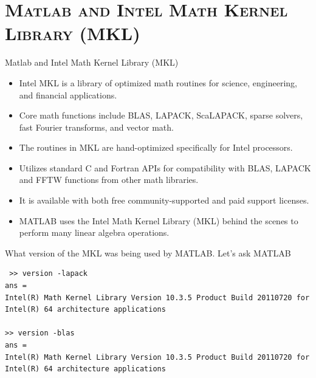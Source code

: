 \documentclass[xcolor=x11names,compress]{beamer}
\renewcommand{\(}{\begin{columns}}
\renewcommand{\)}{\end{columns}}
\newcommand{\<}[1]{\begin{column}{#1}}
\renewcommand{\>}{\end{column}}
\begin{document}
\section{\scshape Matlab and Intel Math Kernel Library (MKL)}
\begin{frame}[fragile]{Matlab and Intel Math Kernel Library (MKL)}
\begin{scriptsize}
\begin{itemize}
\item Intel MKL is a library of optimized math routines for science, engineering, and financial applications.
\item Core math functions include BLAS, LAPACK, ScaLAPACK, sparse solvers, fast Fourier transforms, and vector math. 
\item The routines in MKL are hand-optimized specifically for Intel processors.
\item Utilizes standard C and Fortran APIs for compatibility with BLAS, LAPACK and FFTW functions from other math libraries.
\item It is available with both free community-supported and paid support licenses.
\item MATLAB uses the Intel Math Kernel Library (MKL) behind the scenes to perform many linear algebra operations. 
\end{itemize}
What version of the MKL was being used by MATLAB. Let's ask MATLAB
\end{scriptsize}
\begin{tiny}
\begin{verbatim}
 >> version -lapack
ans =
Intel(R) Math Kernel Library Version 10.3.5 Product Build 20110720 for
Intel(R) 64 architecture applications

>> version -blas
ans =
Intel(R) Math Kernel Library Version 10.3.5 Product Build 20110720 for
Intel(R) 64 architecture applications
\end{verbatim}
\end{tiny}
\end{frame}
\end{document}
